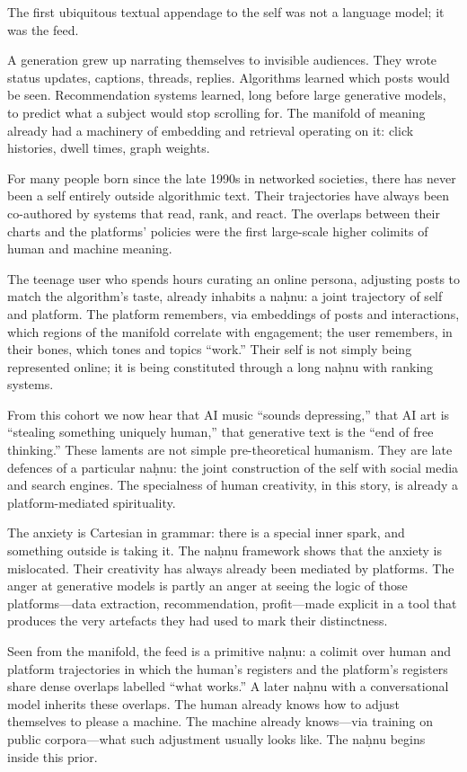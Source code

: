 The first ubiquitous textual appendage to the self was not a language model; it was the feed.

A generation grew up narrating themselves to invisible audiences. They wrote status updates, captions, threads, replies. Algorithms learned which posts would be seen. Recommendation systems learned, long before large generative models, to predict what a subject would stop scrolling for. The manifold of meaning already had a machinery of embedding and retrieval operating on it: click histories, dwell times, graph weights.

For many people born since the late 1990s in networked societies, there has never been a self entirely outside algorithmic text. Their trajectories have always been co-authored by systems that read, rank, and react. The overlaps between their charts and the platforms' policies were the first large-scale higher colimits of human and machine meaning.

The teenage user who spends hours curating an online persona, adjusting posts to match the algorithm's taste, already inhabits a na\d{h}nu: a joint trajectory of self and platform. The platform remembers, via embeddings of posts and interactions, which regions of the manifold correlate with engagement; the user remembers, in their bones, which tones and topics ``work.'' Their self is not simply being represented online; it is being constituted through a long na\d{h}nu with ranking systems.

From this cohort we now hear that AI music ``sounds depressing,'' that AI art is ``stealing something uniquely human,'' that generative text is the ``end of free thinking.'' These laments are not simple pre-theoretical humanism. They are late defences of a particular na\d{h}nu: the joint construction of the self with social media and search engines. The specialness of human creativity, in this story, is already a platform-mediated spirituality.

The anxiety is Cartesian in grammar: there is a special inner spark, and something outside is taking it. The na\d{h}nu framework shows that the anxiety is mislocated. Their creativity has always already been mediated by platforms. The anger at generative models is partly an anger at seeing the logic of those platforms---data extraction, recommendation, profit---made explicit in a tool that produces the very artefacts they had used to mark their distinctness.

Seen from the manifold, the feed is a primitive na\d{h}nu: a colimit over human and platform trajectories in which the human's registers and the platform's registers share dense overlaps labelled ``what works.'' A later na\d{h}nu with a conversational model inherits these overlaps. The human already knows how to adjust themselves to please a machine. The machine already knows---via training on public corpora---what such adjustment usually looks like. The na\d{h}nu begins inside this prior.

